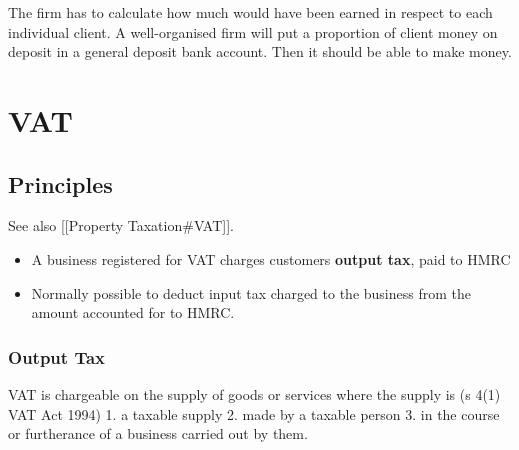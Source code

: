 \documentclass[
]{article}
\newenvironment{Shaded}{}{}
\newcommand{\NormalTok}[1]{#1}
\providecommand{\tightlist}{%
  \setlength{\itemsep}{0pt}\setlength{\parskip}{0pt}}
\begin{document}
The firm has to calculate how much would have been earned in respect to
each individual client. A well-organised firm will put a proportion of
client money on deposit in a general deposit bank account. Then it
should be able to make money.

\hypertarget{vat}{%
\section{VAT}\label{vat}}

\hypertarget{principles-1}{%
\subsection{Principles}\label{principles-1}}

See also {[}{[}Property Taxation\#VAT{]}{]}.

\begin{itemize}
\tightlist
\item
  A business registered for VAT charges customers \textbf{output tax},
  paid to HMRC
\item
  Normally possible to deduct input tax charged to the business from the
  amount accounted for to HMRC.
\end{itemize}

\hypertarget{output-tax}{%
\subsubsection{Output Tax}\label{output-tax}}

\begin{Shaded}
\begin{Highlighting}[]
\NormalTok{VAT is chargeable on the supply of goods or services where the supply is (s 4(1) VAT Act 1994)}
\NormalTok{1. a taxable supply }
\NormalTok{2. made by a taxable person }
\NormalTok{3. in the course or furtherance of a business carried out by them. }
\end{Highlighting}
\end{Shaded}
\end{document}
